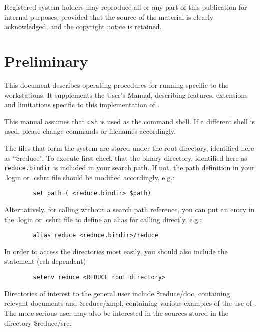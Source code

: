 Registered  system holders may reproduce all or any part of  this
publication  for  internal  purposes,   provided  that the source
of the material is clearly acknowledged, and the copyright notice
is retained.

\newpage
\tableofcontents
\thispagestyle{empty}

\newpage
\setcounter{page}{1}
\pagestyle{plain}

\section{Preliminary}
This document describes operating procedures for running {\REDUCE}
specific to the {\system} workstations.  It supplements the {\REDUCE}
User's Manual, describing features, extensions and limitations specific to
this implementation of {\REDUCE}.

This manual assumes that {\tt csh} is used as the command shell.  If a
different shell is used, please change commands or filenames accordingly.

The files that form the {\REDUCE} system are stored under the {\REDUCE}
root directory, identified here as ``\$reduce''.  To execute {\REDUCE}
first check that the {\REDUCE} binary directory, identified here as
{\tt reduce.bindir} is included in your search path.  If not, the path
definition in your .login or .cshrc file should be modified accordingly,
e.g.:
\begin{verbatim}
        set path=( <reduce.bindir> $path)
\end{verbatim}
Alternatively, for calling {\REDUCE} without a search path reference, you
can put an entry in the .login or .cshrc file to define an alias for
calling {\REDUCE} directly, e.g.:
\begin{verbatim}
        alias reduce <reduce.bindir>/reduce
\end{verbatim}
In order to access the {\REDUCE} directories most easily, you should also
include the statement (csh dependent)
\begin{verbatim}
        setenv reduce <REDUCE root directory>
\end{verbatim}

Directories of interest to the general user include \$reduce/doc,
containing relevant documents and \$reduce/xmpl, containing various
examples of the use of {\REDUCE}.  The more serious user may also be
interested in the {\REDUCE} sources stored in the directory \$reduce/src. \\


